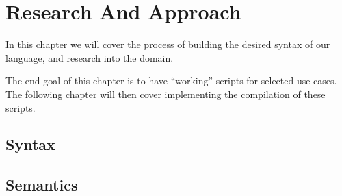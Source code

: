 \chapter{Research And Approach}\label{ch:approach}
In this chapter we will cover the process of building the desired syntax of our language, and research into the domain.

The end goal of this chapter is to have ``working'' scripts for selected use cases.
The following chapter will then cover implementing the compilation of these scripts.


\section{Syntax}\label{sec:syntax}



\section{Semantics}\label{sec:semantics}
